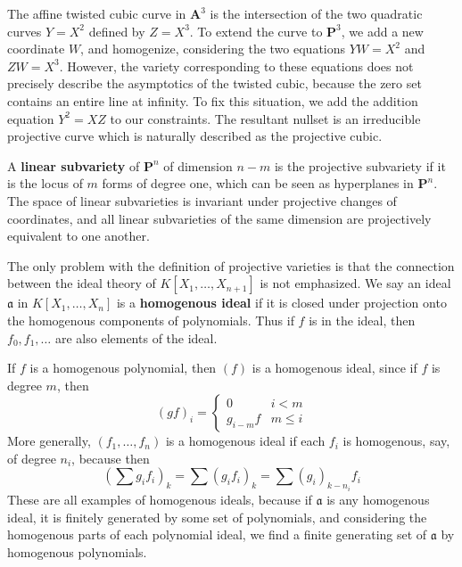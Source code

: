 \begin{example}
    The affine twisted cubic curve in $\mathbf{A}^3$ is the intersection of the two quadratic curves $Y = X^2$ defined by $Z = X^3$. To extend the curve to $\mathbf{P}^3$, we add a new coordinate $W$, and homogenize, considering the two equations $YW = X^2$ and $ZW = X^3$. However, the variety corresponding to these equations does not precisely describe the asymptotics of the twisted cubic, because the zero set contains an entire line at infinity. To fix this situation, we add the addition equation $Y^2 = XZ$ to our constraints. The resultant nullset is an irreducible projective curve which is naturally described as the projective cubic.
\end{example}

\begin{example}
    A {\bf linear subvariety} of $\mathbf{P}^n$ of dimension $n-m$ is the projective subvariety if it is the locus of $m$ forms of degree one, which can be seen as hyperplanes in $\mathbf{P}^n$. The space of linear subvarieties is invariant under projective changes of coordinates, and all linear subvarieties of the same dimension are projectively equivalent to one another.
\end{example}

The only problem with the definition of projective varieties is that the connection between the ideal theory of $K[X_1, \dots, X_{n+1}]$ is not emphasized. We say an ideal $\mathfrak{a}$ in $K[X_1, \dots, X_n]$ is a {\bf homogenous ideal} if it is closed under projection onto the homogenous components of polynomials. Thus if $f$ is in the ideal, then $f_0, f_1, \dots$ are also elements of the ideal.

\begin{example}
    If $f$ is a homogenous polynomial, then $(f)$ is a homogenous ideal, since if $f$ is degree $m$, then
    \[ (gf)_i = \begin{cases} 0 & i < m \\ g_{i-m}f & m \leq i \end{cases} \]
    More generally, $(f_1, \dots, f_n)$ is a homogenous ideal if each $f_i$ is homogenous, say, of degree $n_i$, because then
    \[ \left(\sum g_if_i \right)_k = \sum (g_if_i)_k = \sum (g_i)_{k - n_i} f_i \]
    These are all examples of homogenous ideals, because if $\mathfrak{a}$ is any homogenous ideal, it is finitely generated by some set of polynomials, and considering the homogenous parts of each polynomial ideal, we find a finite generating set of $\mathfrak{a}$ by homogenous polynomials.
\end{example}

